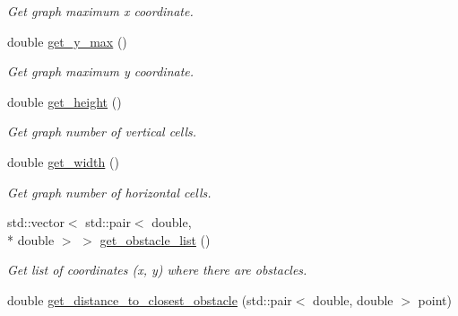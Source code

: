\begin{DoxyCompactItemize}
\begin{DoxyCompactList}\small\item\em Get graph maximum x coordinate. \end{DoxyCompactList}\item 
\hypertarget{classOccupancyMap_a70c8902bc846542c284408360c98902e}{double \hyperlink{classOccupancyMap_a70c8902bc846542c284408360c98902e}{get\-\_\-y\-\_\-max} ()}\label{classOccupancyMap_a70c8902bc846542c284408360c98902e}

\begin{DoxyCompactList}\small\item\em Get graph maximum y coordinate. \end{DoxyCompactList}\item 
\hypertarget{classOccupancyMap_a78dd91852c73cb6fd9522d1f19d552e1}{double \hyperlink{classOccupancyMap_a78dd91852c73cb6fd9522d1f19d552e1}{get\-\_\-height} ()}\label{classOccupancyMap_a78dd91852c73cb6fd9522d1f19d552e1}

\begin{DoxyCompactList}\small\item\em Get graph number of vertical cells. \end{DoxyCompactList}\item 
\hypertarget{classOccupancyMap_a54dab21733516cd0717d9131f0c40998}{double \hyperlink{classOccupancyMap_a54dab21733516cd0717d9131f0c40998}{get\-\_\-width} ()}\label{classOccupancyMap_a54dab21733516cd0717d9131f0c40998}

\begin{DoxyCompactList}\small\item\em Get graph number of horizontal cells. \end{DoxyCompactList}\item 
\hypertarget{classOccupancyMap_a9de8893bf75ccfbc1bb28ce748c2c908}{std\-::vector$<$ std\-::pair$<$ double, \\*
double $>$ $>$ \hyperlink{classOccupancyMap_a9de8893bf75ccfbc1bb28ce748c2c908}{get\-\_\-obstacle\-\_\-list} ()}\label{classOccupancyMap_a9de8893bf75ccfbc1bb28ce748c2c908}

\begin{DoxyCompactList}\small\item\em Get list of coordinates (x, y) where there are obstacles. \end{DoxyCompactList}\item 
\hypertarget{classOccupancyMap_a6bf5d0995c39b532fe7ca8ee0e364945}{double \hyperlink{classOccupancyMap_a6bf5d0995c39b532fe7ca8ee0e364945}{get\-\_\-distance\-\_\-to\-\_\-closest\-\_\-obstacle} (std\-::pair$<$ double, double $>$ point)}\label{classOccupancyMap_a6bf5d0995c39b532fe7ca8ee0e364945}


\end{DoxyCompactItemize}
